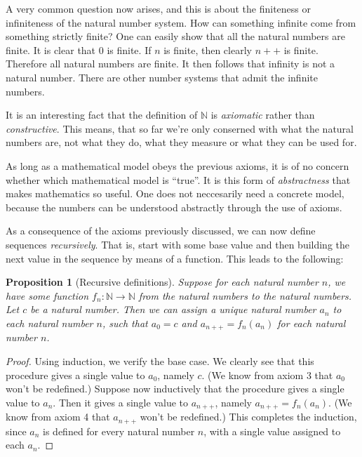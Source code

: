 \documentclass[a4paper, twocolumn]{report}
\newcounter{dummy} \numberwithin{dummy}{section}
\newtheorem{prp}[dummy]{Proposition}
\theoremstyle{definition}
\theoremstyle{solution}
\newcommand{\dplus}{{+}{+}} %
\begin{document}
A very common question now arises, and this is about the finiteness or
infiniteness of the natural number system.  How can something infinite come
from something strictly finite?  One can easily show that all the natural
numbers are finite. It is clear that $0$ is finite. If $n$ is finite, then
clearly $n\dplus$ is finite. Therefore all natural numbers are finite.  It then
follows that infinity is not a natural number. There are other number systems
that admit the infinite numbers.  

It is an interesting fact that the definition of $\mathbb{N}$ is
\textit{axiomatic} rather than \textit{constructive}. This means, that so far
we're only conserned with what the natural numbers are, not what they do, what
they measure or what they can be used for.

As long as a mathematical model obeys the previous axioms, it is of no concern
whether which mathematical model is ``true''. It is this form of
\textit{abstractness} that makes mathematics so useful. One does not
neccesarily need a concrete model, because the numbers can be understood
abstractly through the use of axioms.

As a consequence of the axioms previously discussed, we can now define
sequences \textit{recursively}.  That is, start with some base value and then
building the next value in the sequence by means of a function.  This leads to
the following:

\begin{prp}[Recursive definitions]
  \label{prp_2116}
  Suppose for each natural number $n$, we have some function $f_n:\mathbb{N}
  \rightarrow \mathbb{N}$ from the natural numbers to the natural numbers. Let
  $c$ be a natural number.  Then we can assign a unique natural number $a_n$ to
  each natural number $n$, such that $a_0 = c$ and $a_{n\dplus} = f_{n}\left( a_n
  \right)$ for each natural number $n$. 
\end{prp}
\begin{proof}
  Using induction, we verify the base case. We clearly see that this procedure
  gives a single value to $a_0$, namely $c$. (We know from axiom 3 that $a_0$
  won't be redefined.) Suppose now inductively that the procedure gives a
  single value to $a_n$. Then it gives a single value to $a_{n\dplus}$, namely
  $a_{n\dplus} = f_n\left( a_n \right)$. (We know from axiom 4 that $a_{n\dplus}$ won't
  be redefined.) This completes the induction, since $a_n$ is defined for every
  natural number $n$, with a single value assigned to each $a_n$.
\end{proof}
\end{document}

